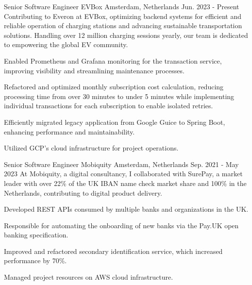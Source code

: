

\begin{cventries}
  \cventry
  {Senior Software Engineer} %
  {EVBox} %
  {Amsterdam, Netherlands} %
  {Jun. 2023 - Present} %
  {
    Contributing to Everon at EVBox, optimizing backend systems for efficient and reliable operation of charging stations and advancing sustainable transportation solutions. Handling over 12 million charging sessions yearly, our team is dedicated to empowering the global EV community.
  }
  {
    \begin{cvitems} %
      \item {Enabled Prometheus and Grafana monitoring for the transaction service, improving visibility and streamlining maintenance processes.}
      \item {Refactored and optimized monthly subscription cost calculation, reducing processing time from over 30 minutes to under 5 minutes while implementing individual transactions for each subscription to enable isolated retries.}
      \item {Efficiently migrated legacy application from Google Guice to Spring Boot, enhancing performance and maintainability.}
      \item {Utilized GCP's cloud infrastructure for project operations.}
    \end{cvitems}
  }

  \cventry
    {Senior Software Engineer} %
    {Mobiquity} %
    {Amsterdam, Netherlands} %
    {Sep. 2021 - May 2023} %
    {
      At Mobiquity, a digital consultancy, I collaborated with SurePay, a market leader with over 22\% of the UK IBAN name check market share and 100\% in the Netherlands, contributing to digital product delivery.
    }
    {
      \begin{cvitems} %
        \item {Developed REST APIs consumed by multiple banks and organizations in the UK.}
        \item {Responsible for automating the onboarding of new banks via the Pay.UK open banking specification.}
        \item {Improved and refactored secondary identification service, which increased performance by 70\%.}
        \item {Managed project resources on AWS cloud infrastructure.}
      \end{cvitems}
    }


\end{cventries}

